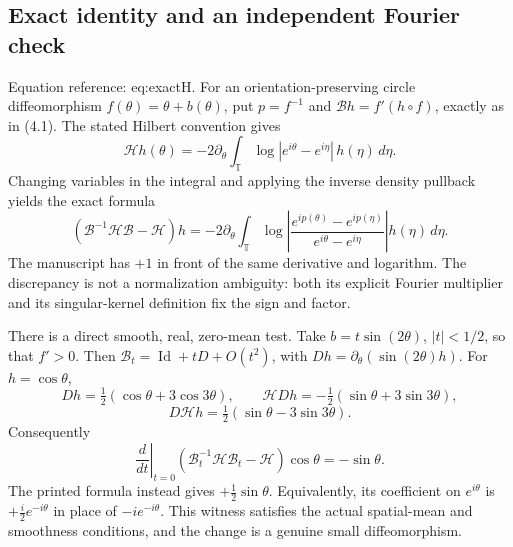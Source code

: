 \documentclass[10pt]{article}
\begin{document}
\subsection*{Exact identity and an independent Fourier check}
Equation reference: eq:exactH. For an orientation-preserving circle diffeomorphism \(f(\theta)=\theta+b(\theta)\), put \(p=f^{-1}\) and \(\mathcal Bh=f'(h\circ f)\), exactly as in (4.1). The stated Hilbert convention gives \[\mathcal Hh(\theta)
  =-2\partial_\theta\int_\mathbb T
     \log|e^{i\theta}-e^{i\eta}|\,h(\eta)\,d\eta.\] Changing variables in the integral and applying the inverse density pullback yields the exact formula \[
 (\mathcal B^{-1}\mathcal H\mathcal B-\mathcal H)h
  =-2\partial_\theta\int_\mathbb T
   \log\left|
    \frac{e^{ip(\theta)}-e^{ip(\eta)}}
         {e^{i\theta}-e^{i\eta}}\right|h(\eta)\,d\eta.\] The manuscript has \(+1\) in front of the same derivative and logarithm. The discrepancy is not a normalization ambiguity: both its explicit Fourier multiplier and its singular-kernel definition fix the sign and factor.\par
There is a direct smooth, real, zero-mean test. Take \(b=t\sin(2\theta)\), \(|t|<1/2\), so that \(f'>0\). Then \(\mathcal B_t=\operatorname{Id}+tD+O(t^2)\), with \(Dh=\partial_\theta(\sin(2\theta)h)\). For \(h=\cos\theta\), \[Dh=\tfrac12(\cos\theta+3\cos3\theta),\qquad
 \mathcal HDh=-\tfrac12(\sin\theta+3\sin3\theta),\] \[D\mathcal Hh=\tfrac12(\sin\theta-3\sin3\theta).\] Consequently \[\left.\frac{d}{dt}\right|_{t=0}
    (\mathcal B_t^{-1}\mathcal H\mathcal B_t-\mathcal H)\cos\theta=-\sin\theta.\] The printed formula instead gives \(+\frac12\sin\theta\). Equivalently, its coefficient on \(e^{i\theta}\) is \(+\frac{i}{2}e^{-i\theta}\) in place of \(-ie^{-i\theta}\). This witness satisfies the actual spatial-mean and smoothness conditions, and the change is a genuine small diffeomorphism.\par
\end{document}
